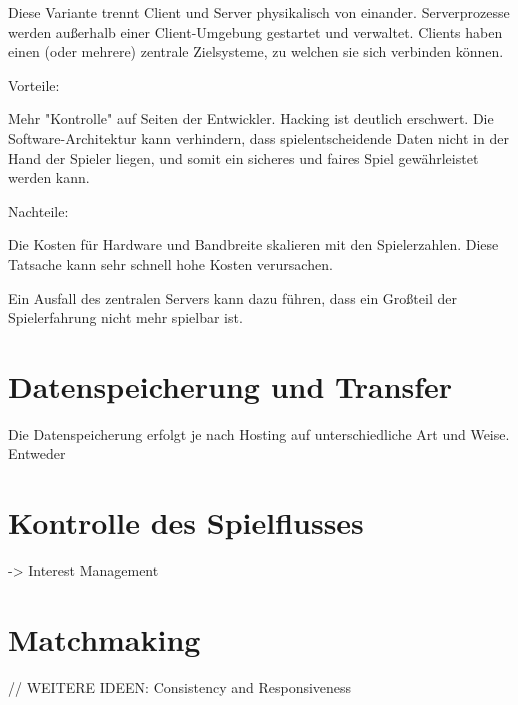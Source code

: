Diese Variante trennt Client und Server physikalisch von einander. Serverprozesse werden außerhalb einer Client-Umgebung gestartet und verwaltet. Clients haben einen (oder mehrere) zentrale Zielsysteme, zu welchen sie sich verbinden können.

Vorteile: 

Mehr "Kontrolle" auf Seiten der Entwickler. Hacking ist deutlich erschwert. Die Software-Architektur kann verhindern, dass spielentscheidende Daten nicht in der Hand der Spieler liegen, und somit ein sicheres und faires Spiel gewährleistet werden kann.


Nachteile: 

Die Kosten für Hardware und Bandbreite skalieren mit den Spielerzahlen. Diese Tatsache kann sehr schnell hohe Kosten verursachen. \cite{Deng.2018}

Ein Ausfall des zentralen Servers kann dazu führen, dass ein Großteil der Spielerfahrung nicht mehr spielbar ist. 


\section{Datenspeicherung und Transfer}

Die Datenspeicherung erfolgt je nach Hosting auf unterschiedliche Art und Weise. Entweder

\section{Kontrolle des Spielflusses}

-> Interest Management


\section{Matchmaking}


// WEITERE IDEEN: Consistency and Responsiveness
